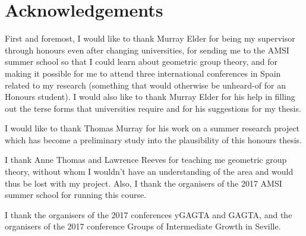 \chapter*{Acknowledgements}

First and foremost, I would like to thank Murray Elder for being my supervisor through honours even after changing universities, for sending me to the AMSI summer school so that I could learn about geometric group theory, and for making it possible for me to attend three international conferences in Spain related to my research (something that would otherwise be unheard-of for an Honours student).
I would also like to thank Murray Elder for his help in filling out the terse forms that universities require and for his suggestions for my thesis.

I would like to thank Thomas Murray for his work on a summer research project which has become a preliminary study into the plausibility of this honours thesis.

I thank Anne Thomas and Lawrence Reeves for teaching me geometric group theory, without whom I wouldn't have an understanding of the area and would thus be lost with my project.
Also, I thank the organisers of the 2017 AMSI summer school for running this course.

I thank the organisers of the 2017 conferences yGAGTA and GAGTA, and the organisers of the 2017 conference Groups of Intermediate Growth in Seville.
